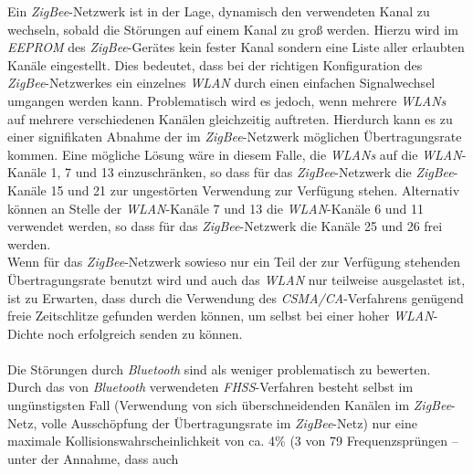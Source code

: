                 Ein \emph{ZigBee}-Netzwerk ist in der Lage, dynamisch den verwendeten Kanal zu wechseln, sobald die
                Störungen auf einem Kanal zu groß werden. Hierzu wird im \emph{EEPROM} des \emph{ZigBee}-Gerätes kein fester
                Kanal sondern eine Liste aller erlaubten Kanäle eingestellt. Dies bedeutet, dass bei der
                richtigen Konfiguration des \emph{ZigBee}-Netzwerkes ein einzelnes \emph{WLAN} durch einen einfachen 
                Signalwechsel umgangen werden kann. Problematisch wird es jedoch, wenn mehrere \emph{WLANs} auf mehrere 
                verschiedenen Kanälen gleichzeitig auftreten. Hierdurch kann es zu einer signifikaten Abnahme der im 
                \emph{ZigBee}-Netzwerk möglichen Übertragungsrate kommen. Eine mögliche Lösung wäre in diesem Falle, die 
                \emph{WLANs} auf die \emph{WLAN}-Kanäle 1, 7 und 13 einzuschränken, so dass für das 
                \emph{ZigBee}-Netzwerk die \emph{ZigBee}-Kanäle 15 und 21 zur ungestörten Verwendung zur Verfügung 
                stehen. Alternativ können an Stelle der \emph{WLAN}-Kanäle 7 und 13 die \emph{WLAN}-Kanäle 6 und 11 
                verwendet werden, so dass für das \emph{ZigBee}-Netzwerk die Kanäle 25 und 26 frei werden.\\
                Wenn für das \emph{ZigBee}-Netzwerk sowieso nur ein Teil der zur Verfügung stehenden Übertragungsrate benutzt
                wird und auch das \emph{WLAN} nur teilweise ausgelastet ist, ist zu Erwarten, dass durch die Verwendung
                des \emph{CSMA/CA}-Verfahrens genügend freie Zeitschlitze gefunden werden können, um selbst bei einer
                hoher \emph{WLAN}-Dichte noch erfolgreich senden zu können.\\
                \\
                Die Störungen durch \emph{Bluetooth} sind als weniger problematisch zu bewerten. Durch das von 
                \emph{Bluetooth} verwendeten \emph{FHSS}-Verfahren besteht selbst im ungünstigsten Fall 
                (Verwendung von sich überschneidenden Kanälen im \emph{ZigBee}-Netz, volle Ausschöpfung der 
                 Übertragungsrate im \emph{ZigBee}-Netz) nur eine maximale Kollisionswahrscheinlichkeit von ca. 
                4\% (3 von 79 Frequenzsprüngen -- unter der Annahme, dass auch
